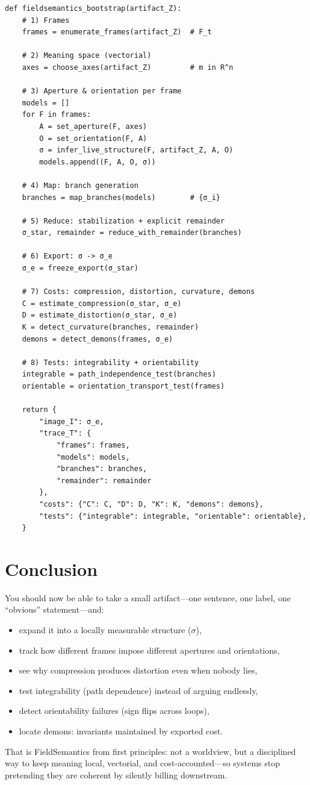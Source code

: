 \documentclass[11pt]{article}
\begin{document}
\begin{lstlisting}[style=py]
def fieldsemantics_bootstrap(artifact_Z):
    # 1) Frames
    frames = enumerate_frames(artifact_Z)  # F_t

    # 2) Meaning space (vectorial)
    axes = choose_axes(artifact_Z)         # m in R^n

    # 3) Aperture & orientation per frame
    models = []
    for F in frames:
        A = set_aperture(F, axes)
        O = set_orientation(F, A)
        σ = infer_live_structure(F, artifact_Z, A, O)
        models.append((F, A, O, σ))

    # 4) Map: branch generation
    branches = map_branches(models)        # {σ_i}

    # 5) Reduce: stabilization + explicit remainder
    σ_star, remainder = reduce_with_remainder(branches)

    # 6) Export: σ -> σ_e
    σ_e = freeze_export(σ_star)

    # 7) Costs: compression, distortion, curvature, demons
    C = estimate_compression(σ_star, σ_e)
    D = estimate_distortion(σ_star, σ_e)
    K = detect_curvature(branches, remainder)
    demons = detect_demons(frames, σ_e)

    # 8) Tests: integrability + orientability
    integrable = path_independence_test(branches)
    orientable = orientation_transport_test(frames)

    return {
        "image_I": σ_e,
        "trace_T": {
            "frames": frames,
            "models": models,
            "branches": branches,
            "remainder": remainder
        },
        "costs": {"C": C, "D": D, "K": K, "demons": demons},
        "tests": {"integrable": integrable, "orientable": orientable},
    }
\end{lstlisting}

\section{Conclusion}

You should now be able to take a small artifact---one sentence, one label, one ``obvious'' statement---and:
\begin{itemize}[leftmargin=2em]
  \item expand it into a locally measurable structure ($\sigma$),
  \item track how different frames impose different apertures and orientations,
  \item see why compression produces distortion even when nobody lies,
  \item test integrability (path dependence) instead of arguing endlessly,
  \item detect orientability failures (sign flips across loops),
  \item locate demons: invariants maintained by exported cost.
\end{itemize}

That is FieldSemantics from first principles: not a worldview, but a disciplined way to keep meaning local, vectorial, and cost-accounted---so systems stop pretending they are coherent by silently billing downstream.
\end{document}
